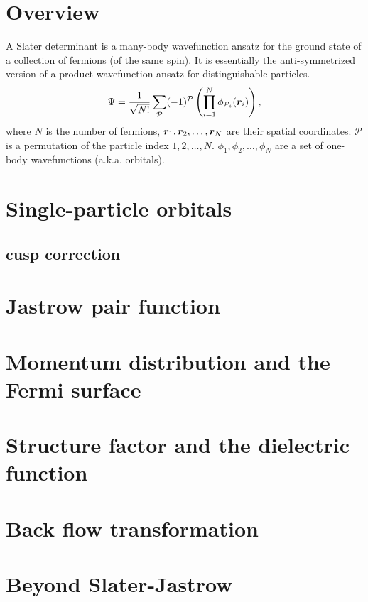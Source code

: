 \section{Overview}

A Slater determinant is a many-body wavefunction ansatz for the ground state of a collection of fermions (of the same spin). It is essentially the anti-symmetrized version of a product wavefunction ansatz for distinguishable particles.
\begin{align}
\Psi = \frac{1}{\sqrt{N!}}\sum\limits_{\mathcal{P}} (-1)^{\mathcal{P}} \left( \prod\limits_{i=1}^N \phi_{\mathcal{P}_i}(\boldsymbol{r}_i) \right),\label{eq:det}
\end{align}
where $N$ is the number of fermions, $\boldsymbol{r}_1, \boldsymbol{r}_2, \dots, \boldsymbol{r}_N$ are their spatial coordinates. $\mathcal{P}$ is a permutation of the particle index $1, 2, \dots, N$. $\phi_1, \phi_2, \dots, \phi_N$ are a set of one-body wavefunctions (a.k.a. orbitals).

\section{Single-particle orbitals}
\subsection{cusp correction}
\section{Jastrow pair function}






\section{Momentum distribution and the Fermi surface}
\section{Structure factor and the dielectric function}
\section{Back flow transformation}
\section{Beyond Slater-Jastrow}